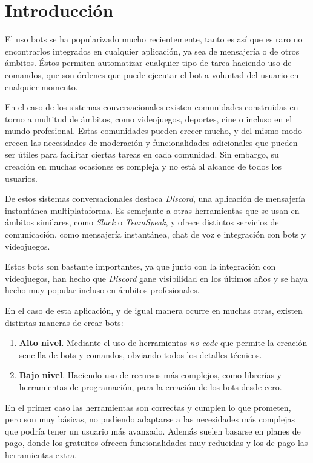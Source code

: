 \chapter{Introducción}

El uso bots se ha popularizado mucho recientemente, tanto es así que es raro no encontrarlos integrados en cualquier aplicación, ya sea de mensajería o de otros ámbitos. Éstos permiten automatizar cualquier tipo de tarea haciendo uso de comandos, que son órdenes que puede ejecutar el bot a voluntad del usuario en cualquier momento.

En el caso de los sistemas conversacionales existen comunidades construidas en torno a multitud de ámbitos, como videojuegos, deportes, cine o incluso en el mundo profesional. Estas comunidades pueden crecer mucho, y del mismo modo crecen las necesidades de moderación y funcionalidades adicionales que pueden ser útiles para facilitar ciertas tareas en cada comunidad. Sin embargo, su creación en muchas ocasiones es compleja y no está al alcance de todos los usuarios.

De estos sistemas conversacionales destaca \textit{Discord}\cite{discord}, una aplicación de mensajería instantánea multiplataforma. Es semejante a otras herramientas que se usan en ámbitos similares, como \textit{Slack}\cite{slack} o \textit{TeamSpeak}\cite{teamspeak}, y ofrece distintos servicios de comunicación, como mensajería instantánea, chat de voz e integración con bots y videojuegos.

Estos bots son bastante importantes, ya que junto con la integración con videojuegos, han hecho que \textit{Discord} gane visibilidad en los últimos años y se haya hecho muy popular incluso en ámbitos profesionales. 

En el caso de esta aplicación, y de igual manera ocurre en muchas otras, existen distintas maneras de crear bots:

\begin{enumerate}
	\item \textbf{Alto nivel}. Mediante el uso de herramientas \textit{no-code} que permite la creación sencilla de bots y comandos, obviando todos los detalles técnicos.
	\item \textbf{Bajo nivel}. Haciendo uso de recursos más complejos, como librerías y herramientas de programación, para la creación de los bots desde cero.
\end{enumerate}

En el primer caso las herramientas son correctas y cumplen lo que prometen, pero son muy básicas, no pudiendo adaptarse a las necesidades más complejas que podría tener un usuario más avanzado. Además suelen basarse en planes de pago, donde los gratuitos ofrecen funcionalidades muy reducidas y los de pago las herramientas extra.

